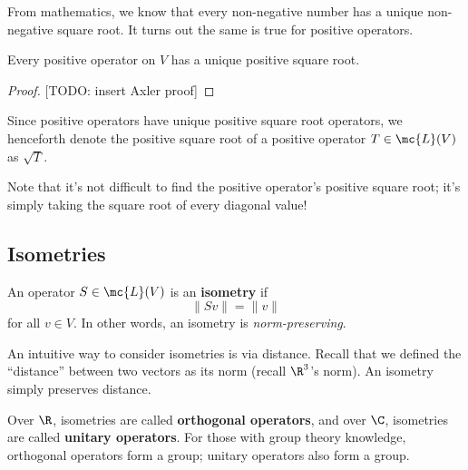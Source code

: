 \documentclass[math0540-lecture-notes.tex]{subfiles}
\begin{document}
From mathematics, we know that every non-negative number has a unique non-negative square root. It
turns out the same is true for positive operators.
\begin{proposition}{}
  Every positive operator on $V$ has a unique positive square root.
\end{proposition}
\begin{proof}[Proof]
  [TODO: insert Axler proof]
\end{proof}

Since positive operators have unique positive square root operators, we henceforth denote the
positive square root of a positive operator $T\in \mc{L}(V)$ as $\sqrt{T}$.
\begin{mdframed}
  Note that it's not difficult to find the positive operator's positive square root; it's simply
  taking the square root of every diagonal value!
\end{mdframed}


\subsection{Isometries}

\begin{definition}[Isometries]{}
  An operator $S\in \mc{L}(V)$ is an \textbf{isometry} if \[
    \|Sv\|=\|v\|
  \] for all $v\in V$. In other words, an isometry is \textit{norm-preserving}.
\end{definition}
An intuitive way to consider isometries is via distance. Recall that we defined the ``distance''
between two vectors as its norm (recall $\R^3$'s norm). An isometry simply preserves distance.
\begin{mdframed}
  Over $\R$, isometries are called \textbf{orthogonal operators}, and over $\C$, isometries are
  called \textbf{unitary operators}. For those with group theory knowledge, orthogonal operators
  form a group; unitary operators also form a group.
\end{mdframed}
\end{document}
